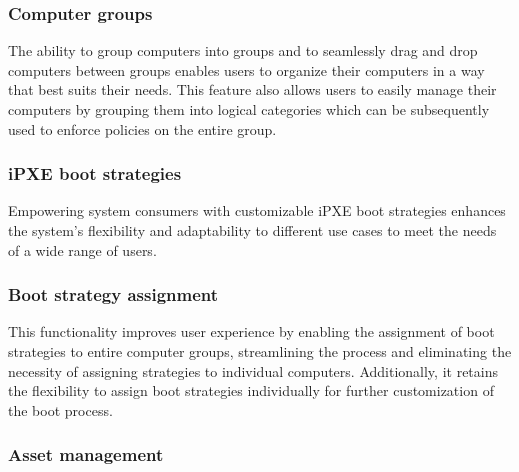 \documentclass[../main.tex]{subfiles}
\begin{document}
\subsubsection{Computer groups}
\label{req-f:computer-groups}

The ability to group computers into groups and to seamlessly drag and drop computers between groups enables users to organize their computers in a way that best suits their needs.
This feature also allows users to easily manage their computers by grouping them into logical categories which can be subsequently used to enforce policies on the entire group.

\subsubsection{iPXE boot strategies}
\label{req-f:boot-strategies}

Empowering system consumers with customizable iPXE boot strategies enhances the system's flexibility and adaptability to different use cases to meet the needs of a wide range of users.

\subsubsection{Boot strategy assignment}
\label{req-f:boot-strategy-assignment}
This functionality improves user experience by enabling the assignment of boot strategies to entire computer groups, streamlining the process and eliminating the necessity of assigning strategies to individual computers. Additionally, it retains the flexibility to assign boot strategies individually for further customization of the boot process.

\subsubsection{Asset management}
\label{req-f:asset-management}
\end{document}
